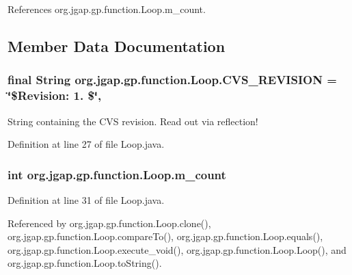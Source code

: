References org.\-jgap.\-gp.\-function.\-Loop.\-m\-\_\-count.



\subsection{Member Data Documentation}
\hypertarget{classorg_1_1jgap_1_1gp_1_1function_1_1_loop_a28b6a164ff3b77e01544e1353626a5c7}{
\subsubsection[{C\-V\-S\-\_\-\-R\-E\-V\-I\-S\-I\-O\-N}]{\setlength{\rightskip}{0pt plus 5cm}final String org.\-jgap.\-gp.\-function.\-Loop.\-C\-V\-S\-\_\-\-R\-E\-V\-I\-S\-I\-O\-N = \char`\"{}\$Revision\-: 1. \$\char`\"{}\hspace{0.3cm}{\ttfamily [static]}, {\ttfamily [private]}}}\label{classorg_1_1jgap_1_1gp_1_1function_1_1_loop_a28b6a164ff3b77e01544e1353626a5c7}
String containing the C\-V\-S revision. Read out via reflection! 

Definition at line 27 of file Loop.\-java.

\hypertarget{classorg_1_1jgap_1_1gp_1_1function_1_1_loop_a61389100a9c8382941df52ef7a84de05}{
\subsubsection[{m\-\_\-count}]{\setlength{\rightskip}{0pt plus 5cm}int org.\-jgap.\-gp.\-function.\-Loop.\-m\-\_\-count\hspace{0.3cm}{\ttfamily [private]}}}\label{classorg_1_1jgap_1_1gp_1_1function_1_1_loop_a61389100a9c8382941df52ef7a84de05}


Definition at line 31 of file Loop.\-java.



Referenced by org.\-jgap.\-gp.\-function.\-Loop.\-clone(), org.\-jgap.\-gp.\-function.\-Loop.\-compare\-To(), org.\-jgap.\-gp.\-function.\-Loop.\-equals(), org.\-jgap.\-gp.\-function.\-Loop.\-execute\-\_\-void(), org.\-jgap.\-gp.\-function.\-Loop.\-Loop(), and org.\-jgap.\-gp.\-function.\-Loop.\-to\-String().

